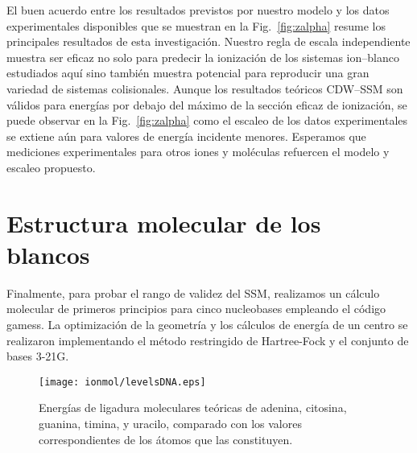 El buen acuerdo entre los resultados previstos por nuestro modelo y los
datos experimentales disponibles que se muestran en la 
Fig.~\ref{fig:zalpha} resume los principales resultados de esta 
investigación. Nuestro regla de escala independiente muestra ser eficaz 
no solo para predecir la ionización de los sistemas ion--blanco 
estudiados aquí sino también muestra potencial para reproducir una gran 
variedad de sistemas colisionales. Aunque los resultados teóricos 
CDW--SSM son válidos para energías por debajo del máximo de la sección 
eficaz de ionización, se puede observar en la Fig.~\ref{fig:zalpha} como 
el escaleo de los datos experimentales se extiene aún para valores de 
energía incidente menores. Esperamos que mediciones experimentales para 
otros iones y moléculas refuercen el modelo y escaleo propuesto.

\section{Estructura molecular de los blancos}
\label{sec:molcalculations}

Finalmente, para probar el rango de validez del SSM, realizamos un 
cálculo molecular de primeros principios para cinco nucleobases 
empleando el código {\sc gamess}. La optimización de la geometría y los 
cálculos de energía de un centro se realizaron implementando el método
restringido de Hartree-Fock y el conjunto de bases 3-21G. 

\begin{figure}
\centering
\texttt{[image: ionmol/levelsDNA.eps]}
\caption[Energías de ligadura moleculares teóricas de ADN y ARN.]
{Energías de ligadura moleculares teóricas de adenina, citosina, guanina, 
timina, y uracilo, comparado con los valores correspondientes de los 
átomos que las constituyen.}
\label{fig:bindener}
\end{figure}

